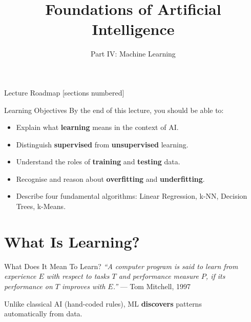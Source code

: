 \documentclass[10pt]{beamer}
\title{Foundations of Artificial Intelligence}
\subtitle{Part IV: Machine Learning}
\institute{Department of Computer Science}
\date{}
\begin{document}
\maketitle

\begin{frame}{Lecture Roadmap}
    [sections numbered]
    \tableofcontents[hideallsubsections]
\end{frame}

\begin{frame}{Learning Objectives}
    By the end of this lecture, you should be able to:
    \begin{itemize}
        \item Explain what \textbf{learning} means in the context of AI.
        \item Distinguish \textbf{supervised} from \textbf{unsupervised} learning.
        \item Understand the roles of \textbf{training} and \textbf{testing} data.
        \item Recognise and reason about \textbf{overfitting} and \textbf{underfitting}.
        \item Describe four fundamental algorithms: Linear Regression, k-NN, Decision Trees, k-Means.
    \end{itemize}
\end{frame}

\section{What Is Learning?}

\begin{frame}{What Does It Mean To Learn?}
    \textit{``A computer program is said to learn from experience $E$ with respect to tasks $T$ and performance measure $P$, if its performance on $T$ improves with $E$.''} \hfill — Tom Mitchell, 1997

    \vspace{0.4cm}
    \begin{center}
    \end{center}
    \vspace{0.25cm}
    Unlike classical AI (hand-coded rules), ML \textbf{discovers} patterns\\
    automatically from data.
\end{frame}
\end{document}
